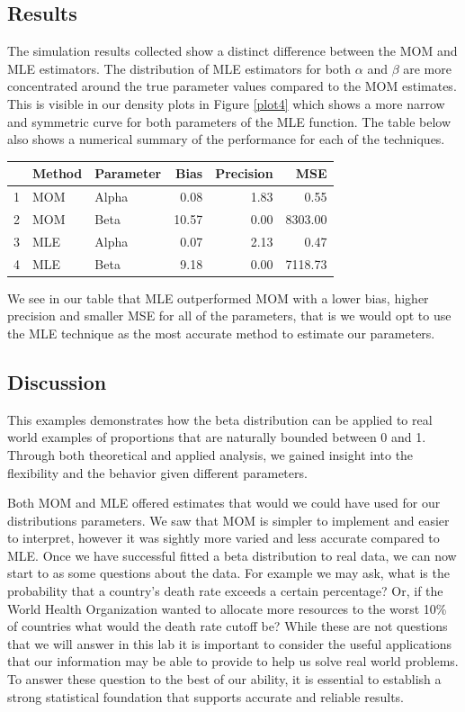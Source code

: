 \documentclass{article}\usepackage[]{graphicx}\usepackage[]{xcolor}
\begin{document}
\begin{multicols}{2}
\subsection{Results}
The simulation results collected show a distinct difference between the MOM and MLE estimators. The distribution of MLE estimators for both $\alpha$ and $\beta$ are more concentrated around the true parameter values compared to the MOM estimates. This is visible in our density plots in Figure \ref{plot4} which shows a more narrow and symmetric curve for both parameters of the MLE function. The table below also shows a numerical summary of the performance for each of the techniques. 
\begin{center}
\small
{}
\label{table3}
\begin{tabular}{rllrrr}
  \hline
 & Method & Parameter & Bias & Precision & MSE \\ 
  \hline
1 & MOM & Alpha & 0.08 & 1.83 & 0.55 \\ 
2 & MOM & Beta & 10.57 & 0.00 & 8303.00 \\ 
3 & MLE & Alpha & 0.07 & 2.13 & 0.47 \\ 
4 & MLE & Beta & 9.18 & 0.00 & 7118.73 \\ 
  \hline
\end{tabular}
\end{center}

We see in our table that MLE outperformed MOM with a lower bias, higher precision and smaller MSE for all of the parameters, that is we would opt to use the MLE technique as the most accurate method to estimate our parameters. 

\subsection{Discussion}
This examples demonstrates how the beta distribution can be applied to real world examples of proportions that are naturally bounded between 0 and 1. Through both theoretical and applied analysis, we gained insight into the flexibility and the behavior given different parameters. 

Both MOM and MLE offered estimates that would we could have used for our distributions parameters. We saw that MOM is simpler to implement and easier to interpret, however it was sightly more varied and less accurate compared to MLE. Once we have successful fitted a beta distribution to real data, we can now start to as some questions about the data. For example we may ask, what is the probability that a country's death rate exceeds a certain percentage? Or, if the World Health Organization wanted to allocate more resources to the worst 10\% of countries what would the death rate cutoff be? While these are not questions that we will answer in this lab it is important to consider the useful applications that our information may be able to provide to help us solve real world problems. To answer these question to the best of our ability, it is essential to establish a strong statistical foundation that supports accurate and reliable results.



\end{multicols}
\end{document}
